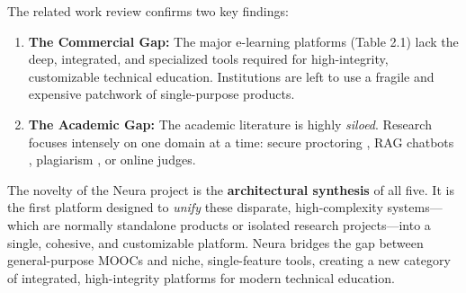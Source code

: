 The related work review confirms two key findings:

\begin{enumerate}
    \item \textbf{The Commercial Gap:} The major e-learning platforms (Table 2.1) lack the deep, integrated, and specialized tools required for high-integrity, customizable technical education. Institutions are left to use a fragile and expensive patchwork of single-purpose products.
    \item \textbf{The Academic Gap:} The academic literature is highly \textit{siloed}. Research focuses intensely on one domain at a time: secure proctoring \cite{proctor_su}, RAG chatbots \cite{lewis2020rag}, plagiarism \cite{jplag1}, or online judges.\cite{oj_survey}
\end{enumerate}

The novelty of the Neura project is the \textbf{architectural synthesis} of all five. It is the first platform designed to \textit{unify} these disparate, high-complexity systems—which are normally standalone products or isolated research projects—into a single, cohesive, and customizable platform. Neura bridges the gap between general-purpose MOOCs and niche, single-feature tools, creating a new category of integrated, high-integrity platforms for modern technical education.